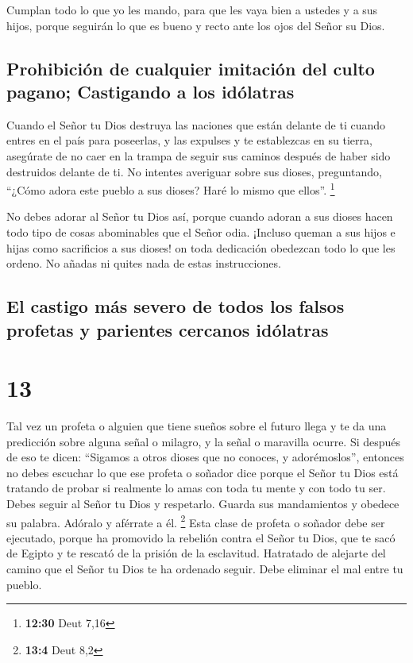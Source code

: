  Cumplan todo lo que yo les mando, para que les vaya bien
a ustedes y a sus hijos, porque seguirán lo que es bueno y recto ante
los ojos del Señor su Dios.

\hypertarget{prohibiciuxf3n-de-cualquier-imitaciuxf3n-del-culto-pagano-castigando-a-los-iduxf3latras}{%
\subsection{Prohibición de cualquier imitación del culto pagano;
Castigando a los
idólatras}\label{prohibiciuxf3n-de-cualquier-imitaciuxf3n-del-culto-pagano-castigando-a-los-iduxf3latras}}

 Cuando el Señor tu Dios destruya las naciones que están
delante de ti cuando entres en el país para poseerlas, y las expulses y
te establezcas en su tierra,  asegúrate de no caer en la
trampa de seguir sus caminos después de haber sido destruidos delante de
ti. No intentes averiguar sobre sus dioses, preguntando, ``¿Cómo adora
este pueblo a sus dioses? Haré lo mismo que ellos''. \footnote{\textbf{12:30}
  Deut 7,16}

 No debes adorar al Señor tu Dios así, porque cuando
adoran a sus dioses hacen todo tipo de cosas abominables que el Señor
odia. ¡Incluso queman a sus hijos e hijas como sacrificios a sus dioses!
 on toda dedicación obedezcan todo lo que les ordeno. No
añadas ni quites nada de estas instrucciones.

\hypertarget{el-castigo-muxe1s-severo-de-todos-los-falsos-profetas-y-parientes-cercanos-iduxf3latras}{%
\subsection{El castigo más severo de todos los falsos profetas y
parientes cercanos
idólatras}\label{el-castigo-muxe1s-severo-de-todos-los-falsos-profetas-y-parientes-cercanos-iduxf3latras}}

\hypertarget{section-12}{%
\section{13}\label{section-12}}

 Tal vez un profeta o alguien que tiene sueños sobre el
futuro llega y te da una predicción sobre alguna señal o milagro,
 y la señal o maravilla ocurre. Si después de eso te
dicen: ``Sigamos a otros dioses que no conoces, y adorémoslos'',
 entonces no debes escuchar lo que ese profeta o soñador
dice porque el Señor tu Dios está tratando de probar si realmente lo
amas con toda tu mente y con todo tu ser.  Debes seguir al
Señor tu Dios y respetarlo. Guarda sus mandamientos y obedece su
palabra. Adóralo y aférrate a él. \footnote{\textbf{13:4} Deut 8,2}
 Esta clase de profeta o soñador debe ser ejecutado,
porque ha promovido la rebelión contra el Señor tu Dios, que te sacó de
Egipto y te rescató de la prisión de la esclavitud. Hatratado de
alejarte del camino que el Señor tu Dios te ha ordenado seguir. Debe
eliminar el mal entre tu pueblo.

